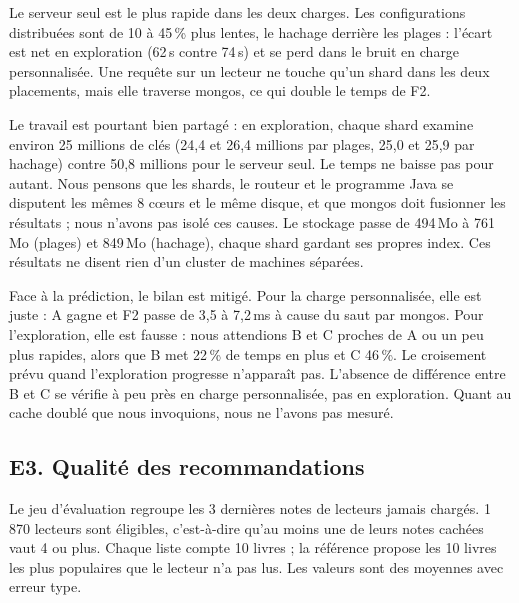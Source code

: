 \documentclass[11pt,a4paper]{article}
\begin{document}
Le serveur seul est le plus rapide dans les deux charges. Les configurations distribuées sont de 10 à 45\,\% plus lentes, le hachage derrière les plages : l'écart est net en exploration (62\,s contre 74\,s) et se perd dans le bruit en charge personnalisée. Une requête sur un lecteur ne touche qu'un shard dans les deux placements, mais elle traverse mongos, ce qui double le temps de F2.

Le travail est pourtant bien partagé : en exploration, chaque shard examine environ 25 millions de clés (24,4 et 26,4 millions par plages, 25,0 et 25,9 par hachage) contre 50,8 millions pour le serveur seul. Le temps ne baisse pas pour autant. Nous pensons que les shards, le routeur et le programme Java se disputent les mêmes 8 cœurs et le même disque, et que mongos doit fusionner les résultats ; nous n'avons pas isolé ces causes. Le stockage passe de 494\,Mo à 761\,Mo (plages) et 849\,Mo (hachage), chaque shard gardant ses propres index. Ces résultats ne disent rien d'un cluster de machines séparées.

Face à la prédiction, le bilan est mitigé. Pour la charge personnalisée, elle est juste : A gagne et F2 passe de 3,5 à 7,2\,ms à cause du saut par mongos. Pour l'exploration, elle est fausse : nous attendions B et C proches de A ou un peu plus rapides, alors que B met 22\,\% de temps en plus et C 46\,\%. Le croisement prévu quand l'exploration progresse n'apparaît pas. L'absence de différence entre B et C se vérifie à peu près en charge personnalisée, pas en exploration. Quant au cache doublé que nous invoquions, nous ne l'avons pas mesuré.

\subsection{E3. Qualité des recommandations}
Le jeu d'évaluation regroupe les 3 dernières notes de lecteurs jamais chargés. 1\,870 lecteurs sont éligibles, c'est-à-dire qu'au moins une de leurs notes cachées vaut 4 ou plus. Chaque liste compte 10 livres ; la référence propose les 10 livres les plus populaires que le lecteur n'a pas lus. Les valeurs sont des moyennes avec erreur type.
\end{document}
